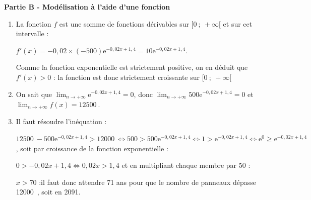 \documentclass[10pt]{article}
\providecommand{\e}{{\mathrm{e}}}
\providecommand{\np}[2][]{{#2~#1}}
\begin{document}
\bigskip

\textbf{Partie B - Modélisation à l'aide d'une fonction}







\medskip

\begin{enumerate}
\item 
La fonction $f$ est une somme de fonctions dérivables sur $[0~;~ +\infty[$ et sur cet intervalle :

$f'(x) = - 0,02 \times (- 500)\e^{-0,02x+1,4} = 10\e^{-0,02x+1,4}$.

Comme la fonction exponentielle est strictement positive, on en déduit que $f'(x) > 0$ : la fonction est donc strictement croissante sur $[0~;~ +\infty[$ 
\item 
On sait que $\displaystyle\lim_{n \to + \infty} \e^{-0,02x+1,4} = 0$, donc $\displaystyle\lim_{n \to + \infty} 500 \e^{-0,02x+1,4} = 0$ et $\displaystyle\lim_{n \to + \infty} f(x) = \np{12500}$.
\item 
Il faut résoudre l'inéquation :

$\np{12500} - 500 \e^{-0,02x+1,4} > \np{12000} \iff 500 > 500\e^{-0,02x+1,4} \iff 1 >\e^{-0,02x+1,4} \iff \e^0 \geqslant \e^{-0,02x+1,4}$, soit par croissance de la fonction exponentielle :

$0 > - 0,02x + 1,4 \iff 0,02x > 1,4$ et en multipliant chaque membre par 50 : 

$x > 70$ :il faut donc attendre 71 ans pour que le nombre de panneaux dépasse \np{12000}, soit en 2091.

\end{enumerate}

\bigskip
\end{document}
